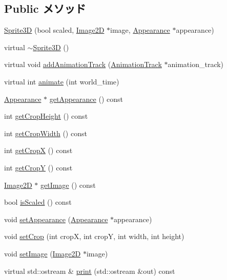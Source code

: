 \subsection*{Public メソッド}
\begin{CompactItemize}
\item 
\hyperlink{classm3g_1_1Sprite3D_9cb33fd453d441ed8e99b95f5e29df0c}{Sprite3D} (bool scaled, \hyperlink{classm3g_1_1Image2D}{Image2D} $\ast$image, \hyperlink{classm3g_1_1Appearance}{Appearance} $\ast$appearance)
\item 
virtual \hyperlink{classm3g_1_1Sprite3D_a57bd1e3141ba11c88ddec1e46c188d6}{$\sim$Sprite3D} ()
\item 
virtual void \hyperlink{classm3g_1_1Sprite3D_415c0b110f95410ded9b85e5d99a496b}{addAnimationTrack} (\hyperlink{classm3g_1_1AnimationTrack}{AnimationTrack} $\ast$animation\_\-track)
\item 
virtual int \hyperlink{classm3g_1_1Sprite3D_8aad1ceab4c2a03609c8a42324ce484d}{animate} (int world\_\-time)
\item 
\hyperlink{classm3g_1_1Appearance}{Appearance} $\ast$ \hyperlink{classm3g_1_1Sprite3D_0219cb20ddea978a5796b5b414d012d2}{getAppearance} () const 
\item 
int \hyperlink{classm3g_1_1Sprite3D_d6d9d6f23b7bb004c93642bcd081f4a3}{getCropHeight} () const 
\item 
int \hyperlink{classm3g_1_1Sprite3D_5c6515f6706675ef31ca5dfa0a03b953}{getCropWidth} () const 
\item 
int \hyperlink{classm3g_1_1Sprite3D_d0ba0211183decc8f0459ca598b12912}{getCropX} () const 
\item 
int \hyperlink{classm3g_1_1Sprite3D_9ef03b219415a1f08aef6745ad5d87d0}{getCropY} () const 
\item 
\hyperlink{classm3g_1_1Image2D}{Image2D} $\ast$ \hyperlink{classm3g_1_1Sprite3D_a8c0193b0e7d47d4b5c9f60df24c44f5}{getImage} () const 
\item 
bool \hyperlink{classm3g_1_1Sprite3D_8e3e7fa70e1d3f2342580991105779f5}{isScaled} () const 
\item 
void \hyperlink{classm3g_1_1Sprite3D_b9b44bad4241635062ed66437c9bae48}{setAppearance} (\hyperlink{classm3g_1_1Appearance}{Appearance} $\ast$appearance)
\item 
void \hyperlink{classm3g_1_1Sprite3D_92660f9625c68b0169ee84bbc4586187}{setCrop} (int cropX, int cropY, int width, int height)
\item 
void \hyperlink{classm3g_1_1Sprite3D_705b89b41cd1b38f664ed912be44baaa}{setImage} (\hyperlink{classm3g_1_1Image2D}{Image2D} $\ast$image)
\item 
virtual std::ostream \& \hyperlink{classm3g_1_1Sprite3D_6fea17fa1532df3794f8cb39cb4f911f}{print} (std::ostream \&out) const 
\end{CompactItemize}
